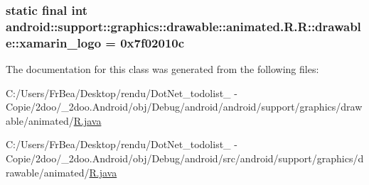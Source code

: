 \hypertarget{classandroid_1_1support_1_1graphics_1_1drawable_1_1animated_1_1_r_1_1drawable_1cb6b8505295e9a6150dcaffdccd15f4}{
\subsubsection[{xamarin\_\-logo}]{\setlength{\rightskip}{0pt plus 5cm}static final int android::support::graphics::drawable::animated.R.R::drawable::xamarin\_\-logo = 0x7f02010c}}
\label{classandroid_1_1support_1_1graphics_1_1drawable_1_1animated_1_1_r_1_1drawable_1cb6b8505295e9a6150dcaffdccd15f4}




The documentation for this class was generated from the following files:\begin{CompactItemize}
\item 
C:/Users/FrBea/Desktop/rendu/DotNet\_\-todolist\_ - Copie/2doo/\_\-2doo.Android/obj/Debug/android/android/support/graphics/drawable/animated/\hyperlink{android_2support_2graphics_2drawable_2animated_2_r_8java}{R.java}\item 
C:/Users/FrBea/Desktop/rendu/DotNet\_\-todolist\_ - Copie/2doo/\_\-2doo.Android/obj/Debug/android/src/android/support/graphics/drawable/animated/\hyperlink{src_2android_2support_2graphics_2drawable_2animated_2_r_8java}{R.java}\end{CompactItemize}
